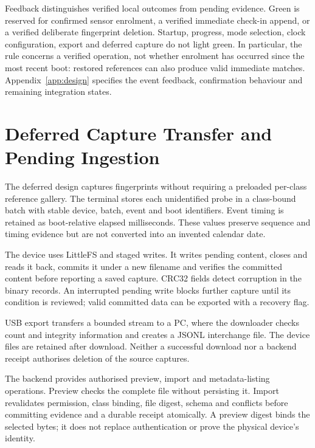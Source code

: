 Feedback distinguishes verified local outcomes from pending evidence. Green is
reserved for confirmed sensor enrolment, a verified immediate check-in append,
or a verified deliberate fingerprint deletion. Startup, progress, mode selection,
clock configuration, export and deferred capture do not light green. In
particular, the rule concerns a verified operation, not whether enrolment has
occurred since the most recent boot: restored references can also produce valid
immediate matches. Appendix~\ref{app:design} specifies the event feedback,
confirmation behaviour and remaining integration states.

\section{Deferred Capture Transfer and Pending Ingestion}\label{sec:3-9}

The deferred design captures fingerprints without requiring a preloaded per-class reference gallery. The terminal stores each unidentified probe in a class-bound batch with stable device, batch, event and boot identifiers. Event timing is retained as boot-relative elapsed milliseconds. These values preserve sequence and timing evidence but are not converted into an invented calendar date.

The device uses LittleFS and staged writes. It writes pending content, closes and reads it back, commits it under a new filename and verifies the committed content before reporting a saved capture. CRC32 fields detect corruption in the binary records. An interrupted pending write blocks further capture until its condition is reviewed; valid committed data can be exported with a recovery flag.

USB export transfers a bounded stream to a PC, where the downloader checks count and integrity information and creates a JSONL interchange file. The device files are retained after download. Neither a successful download nor a backend receipt authorises deletion of the source captures.




The backend provides authorised preview, import and metadata-listing operations. Preview checks the complete file without persisting it. Import revalidates permission, class binding, file digest, schema and conflicts before committing evidence and a durable receipt atomically. A preview digest binds the selected bytes; it does not replace authentication or prove the physical device's identity.

